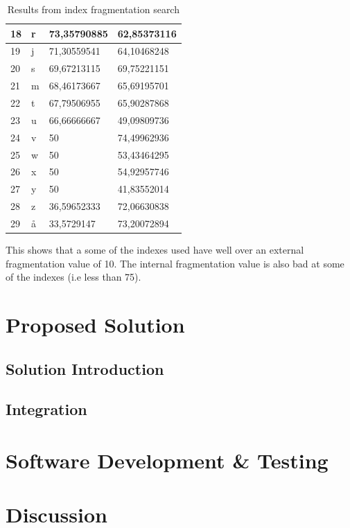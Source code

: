 \documentclass{cslthse-msc}
\begin{document}
\begin{table}[H]
\begin{center}
\begin{tabular}{|l|l|l|l|}
18 & r & 73,35790885 & 62,85373116 \\ \hline
19 & j & 71,30559541 & 64,10468248 \\ \hline
20 & s & 69,67213115 & 69,75221151 \\ \hline
21 & m & 68,46173667 & 65,69195701 \\ \hline
22 & t & 67,79506955 & 65,90287868 \\ \hline
23 & u & 66,66666667 & 49,09809736 \\ \hline
24 & v & 50          & 74,49962936 \\ \hline
25 & w & 50          & 53,43464295 \\ \hline
26 & x & 50          & 54,92957746 \\ \hline
27 & y & 50          & 41,83552014 \\ \hline
28 & z & 36,59652333 & 72,06630838 \\ \hline
29 & å & 33,5729147  & 73,20072894 \\ \hline
\end{tabular}
\caption{Results from index fragmentation search}
\end{center}
\end{table}

This shows that a some of the indexes used have well over an external fragmentation value of 10. The internal fragmentation value is also bad at some of the indexes (i.e less than 75).

\chapter{Proposed Solution}

\section{Solution Introduction}

\section{Integration}

\chapter{Software Development \& Testing}

\chapter{Discussion}
\end{document}
